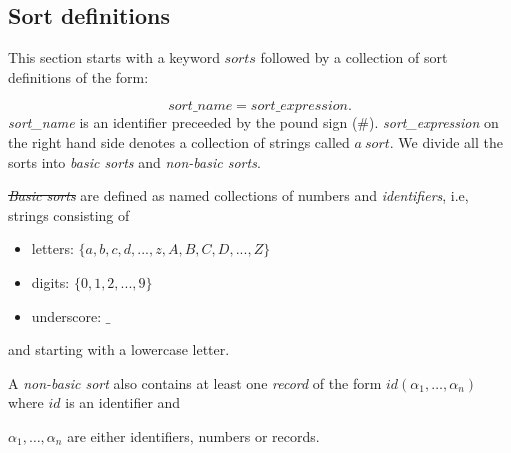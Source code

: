 \documentclass[12pt, letterpaper]{article}
\begin{document}
\subsection{Sort definitions}\label{ss}


This section starts with a keyword $sorts$ followed by a collection of sort definitions of the form:


\begin{equation*}
  sort\_name=sort\_expression.
\end{equation*}
\textit{sort\_name} is an identifier preceeded by the pound sign (\#).
\textit{sort\_expression}  on the right hand side denotes a collection of strings called  $a~sort$. We divide all the sorts into \textit{basic sorts} and \textit{non-basic sorts}. 

\st \textit{Basic sorts} are defined as named collections of numbers and \textit{identifiers}, i.e, strings consisting of

\begin{itemize}

 \item letters: $\{a,b,c,d,...,z,A,B,C,D,...,Z\}$

 \item digits: $\{0,1,2,...,9\}$

 \item underscore: $\_$

\end{itemize}

and starting with a lowercase letter.



A \textit{non-basic sort} also contains at least one \textit{record} of the form $id(\alpha_1,\dots, \alpha_n)$ where $id$ is an identifier and 

$\alpha_1, \dots, \alpha_n$ are either identifiers, numbers or records. 
\end{document}
